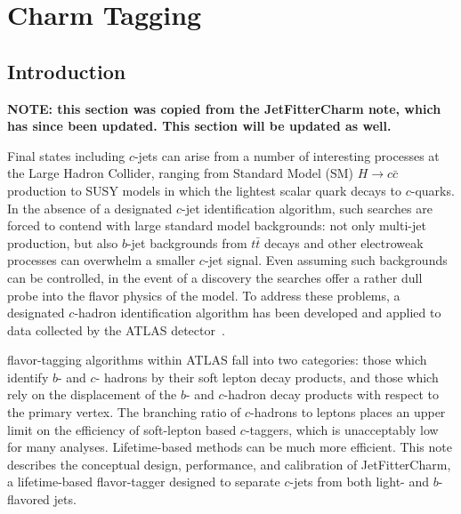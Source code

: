 \chapter{Charm Tagging}

\section{Introduction}
\label{tag:sec:into}

\newcommand{\catpt}{15, 25, 35, 50, 80, 120, 200, $\infty$}
\newcommand{\cateta}{0, 0.7, 1.5, 2.5}
\newcommand{\jfcplotswherefrom}{The jets are from $t \bar{t}$ simulated events generated with \textsc{Powheg+Pythia6}.}

\textbf{NOTE: this section was copied from the JetFitterCharm note, which has since been updated. This section will be updated as well.}

Final states including $c$-jets can arise from a number of interesting processes at the Large Hadron Collider, ranging from Standard Model (SM) $H \to c\bar{c}$ production to SUSY models in which the lightest scalar quark decays to $c$-quarks. In the absence of a designated $c$-jet identification algorithm, such searches are forced to contend with large standard model backgrounds: not only multi-jet production, but also $b$-jet backgrounds from $t\bar{t}$ decays and other electroweak processes can overwhelm a smaller $c$-jet signal. Even assuming such backgrounds can be controlled, in the event of a discovery the searches offer a rather dull probe into the flavor physics of the model. To address these problems, a designated $c$-hadron identification algorithm has been developed and applied to data collected by the ATLAS detector~\cite{DetPap}.

flavor-tagging algorithms within ATLAS fall into two categories: those which identify $b$- and $c$- hadrons by their soft lepton decay products, and those which rely on the displacement of the $b$- and $c$-hadron decay products with respect to the primary vertex. The branching ratio of $c$-hadrons to leptons places an upper limit on the efficiency of soft-lepton based $c$-taggers, which is unacceptably low for many analyses. Lifetime-based methods can be much more efficient.
This note describes the conceptual design, performance, and calibration of JetFitterCharm, a lifetime-based flavor-tagger designed to separate $c$-jets from both light- and $b$-flavored jets.

